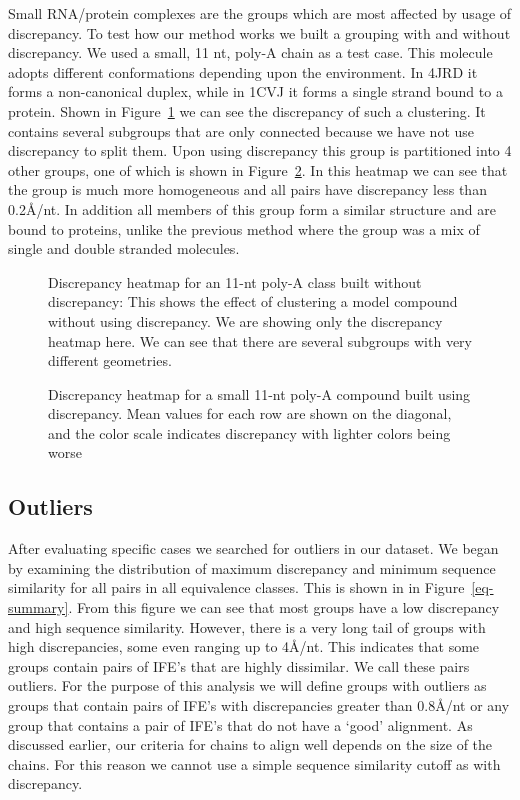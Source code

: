 Small RNA/protein complexes are the groups which are most affected by usage of
discrepancy. To test how our method works we built a grouping with and without
discrepancy. We used a small, 11 nt, poly-A chain as a test case. This molecule
adopts different conformations depending upon the environment. In 4JRD it forms
a non-canonical duplex, while in 1CVJ it forms a single strand bound to a
protein. Shown in Figure~\ref{fig:small-aa-no-disc} we can see the discrepancy
of such a clustering. It contains several subgroups that are only connected
because we have not use discrepancy to split them. Upon using discrepancy this
group is partitioned into 4 other groups, one of which is shown in
Figure~\ref{fig:small-aa-disc}.  In this heatmap we can see that the group is
much more homogeneous and all pairs have discrepancy less than 0.2Å/nt. In
addition all members of this group form a similar structure and are bound to
proteins, unlike the previous method where the group was a mix of single and
double stranded molecules. 

\begin{figure}
  \caption{Discrepancy heatmap for an 11-nt poly-A class built without
    discrepancy: This shows the effect of clustering a model compound without
    using discrepancy. We are showing only the discrepancy heatmap here. We can
  see that there are several subgroups with very different geometries.}
  \label{fig:small-aa-no-disc}
\end{figure}

\begin{figure}
  \caption{Discrepancy heatmap for a small 11-nt poly-A compound built using
    discrepancy. Mean values for each row are shown on the diagonal, and the
  color scale indicates discrepancy with lighter colors being worse}
  \label{fig:small-aa-disc}
\end{figure}

\subsection{Outliers}

After evaluating specific cases we searched for outliers in our dataset. We
began by examining the distribution of maximum discrepancy and minimum sequence
similarity for all pairs in all equivalence classes. This is shown in in
Figure~\ref{eq-summary}. From this figure we can see that most groups have a low
discrepancy and high sequence similarity. However, there is a very long tail of
groups with high discrepancies, some even ranging up to 4Å/nt. This indicates
that some groups contain pairs of IFE’s that are highly dissimilar. We call
these pairs outliers. For the purpose of this analysis we will define groups
with outliers as groups that contain pairs of IFE’s with discrepancies greater
than 0.8Å/nt or any group that contains a pair of IFE’s that do not have a
‘good’ alignment. As discussed earlier, our criteria for chains to align well
depends on the size of the chains. For this reason we cannot use a simple
sequence similarity cutoff as with discrepancy. 

